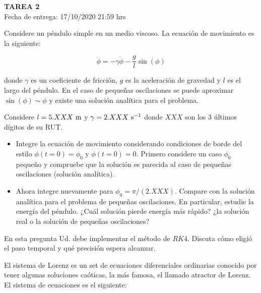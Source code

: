 \documentclass[letter, 11pt]{article}
\newcommand{\tareanro}{2}
\newcommand{\fechaentrega}{17/10/2020 21:59 hrs}
\begin{document}
\thispagestyle{firstpage}

\begin{center}
  {\uppercase{\LARGE \bf Tarea \tareanro}}\\
  Fecha de entrega: \fechaentrega
\end{center}



Considere un péndulo simple en un medio viscoso. La ecuación de movimiento es
la siguiente:

$$ \ddot{\phi} = -\gamma \dot{\phi} - \frac{g}{l} \sin(\phi)$$

\noindent donde $\gamma$ es un coeficiente de fricción, $g$ es la aceleración
de gravedad y $l$ es el largo del péndulo. En el caso de pequeñas oscilaciones
se puede aproximar $\sin(\phi)\sim\phi$ y existe una solución analítica para el
problema.

Considere $l=5.XXX\ {\rm m}$ y $\gamma=2.XXX\ {\rm s^{-1}}$ donde $XXX$ son los 3
últimos dígitos de su RUT.

\begin{itemize}

  \item Integre la ecuación de movimiento considerando condiciones de borde del
    estilo $\phi(t=0) = \phi_0$ y $\dot{\phi}(t=0) = 0$. Primero considere un
    caso $\phi_0$ pequeño y compruebe que la solución es parecida al caso de
    pequeñas oscilaciones (solución analítica).

  \item Ahora integre nuevamente para $\phi_0=\pi/(2.XXX)$. Compare con la
    solución analítica para el problema de pequeñas oscilaciones. En
    particular, estudie la energía del péndulo. ¿Cuál solución pierde energía
    más rápido? ¿la solución real o la solución de pequeñas oscilaciones?

\end{itemize}

En esta pregunta Ud. debe implementar el método de $RK4$. Discuta cómo eligió
el paso temporal y qué precisión espera alcanzar.


\vspace{1.5em}

El sistema de Lorenz es un set de ecuaciones diferenciales ordinarias conocido
por tener algunas soluciones caóticas, la más famosa, el llamado atractor de
Lorenz. El sistema de ecuaciones es el siguiente:
\end{document}

